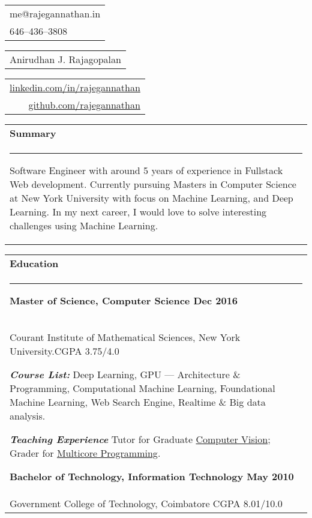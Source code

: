 \documentclass{article}
\begin{document}
{\small\begin{tabular}[c]{l}
	me@rajegannathan.in \\
	646--436--3808
\end{tabular}}\hfill%
{\Large\bfseries\begin{tabular}[c]{c}
	Anirudhan J. Rajagopalan
\end{tabular}}\hfill%
{\small\begin{tabular}[c]{r}
	\href{https://linkedin.com/in/rajegannathan}{linkedin.com/in/rajegannathan} \\
	\href{https://github.com/rajegannathan}{github.com/rajegannathan}
\end{tabular}}%

\bigskip

\begin{tabular}{p{\dimexpr\linewidth-2\tabcolsep}}
	\textbf{\large{Summary}}\\
	\noindent\rule{\textwidth}{0.4pt}
	\begin{adjustwidth}{0.5cm}{0.5cm}
	\small{Software Engineer with around 5 years of experience in Fullstack Web development. Currently pursuing Masters in Computer Science at New York University with focus on Machine Learning, and Deep Learning.  In my next career, I would love to solve interesting challenges using Machine Learning.}
	\end{adjustwidth}
\end{tabular}

\begin{tabular}{p{\dimexpr\linewidth-2\tabcolsep}}
	\textbf{\large{Education}} \\
	\noindent\rule{\textwidth}{0.4pt}
	{\bfseries Master of Science, Computer Science \hfill Dec 2016} \\
	\quad Courant Institute of Mathematical Sciences, New York University.\hfill CGPA 3.75/4.0
	\begin{adjustwidth}{0.3cm}{}
	\textbf{\textit{Course List:}} Deep Learning, GPU --- Architecture \& Programming, Computational Machine Learning, Foundational Machine Learning, Web Search Engine, Realtime \& Big data analysis.
	\end{adjustwidth}
	\begin{adjustwidth}{0.3cm}{}
        \textbf{\textit{Teaching Experience}} Tutor for Graduate \href{http://cs.nyu.edu/~fergus/teaching/vision/index.html}{Computer Vision};  Grader for \href{http://cs.nyu.edu/courses/fall16/CSCI-GA.3033-017/}{Multicore Programming}.
	\end{adjustwidth}

	\smallskip
	{\bfseries Bachelor of Technology, Information Technology \hfill May 2010} \\
	\quad Government College of Technology, Coimbatore \hfill CGPA 8.01/10.0
\end{tabular}
\end{document}
